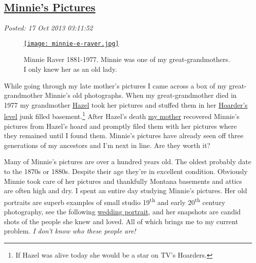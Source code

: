 %

\subsection*{\href{https://bakerjd99.wordpress.com/2013/10/16/minnies-pictures/}{Minnie's Pictures}}


\noindent\emph{Posted: 17 Oct 2013 03:11:52}
\vspace{6pt}




\captionsetup[figure]{labelformat=empty}
\begin{SCfigure}[1.5][!h]
\centering
\href{http://conceptcontrol.smugmug.com/People/Minnie-Raver/i-k6pnSJ4/A}{\texttt{[image: minnie-e-raver.jpg]}}
\caption{Minnie Raver 1881-1977. Minnie was one of my great-grandmothers. I only knew her as an old
lady.}
\label{fig:4230X0}
\end{SCfigure}


While going through my late mother's pictures I came across a box of my
great-grandmother Minnie's old photographs. When my great-grandmother
died in 1977 my grandmother
\href{http://conceptcontrol.smugmug.com/People/Grandparents-1/i-PBjmr7p/A}{Hazel}
took her pictures and stuffed them in her
\href{http://www.aetv.com/hoarders/}{Hoarder's level} junk filled
basement.\footnote{
If Hazel was alive today she would be a star on TV's Hoarders.
} After Hazel's death
\href{http://conceptcontrol.smugmug.com/People/The-Way-We-Were/i-Z64DmrR/A}{my
mother} recovered Minnie's pictures from Hazel's hoard and promptly
filed them with her pictures where they remained until I found them.
Minnie's pictures have already seen off three generations of my
ancestors and I'm next in line. Are they worth it?

Many of Minnie's pictures are over a hundred years old. The oldest
probably date to the 1870s or 1880s. Despite their age they're in
excellent condition. Obviously Minnie took care of her pictures and
thankfully Montana basements and attics are often high and dry. I spent
an entire day studying Minnie's pictures. Her old portraits are superb
examples of small studio 19\textsuperscript{th} and early
20\textsuperscript{th} century photography, see the following
\href{https://familysearch.org/pal:/MM9.1.1/F3SR-Q8S}{wedding portrait},
and her snapshots are candid shots of the people she knew and loved. All
of which brings me to my current problem. \emph{I don't know who these
people are!}



